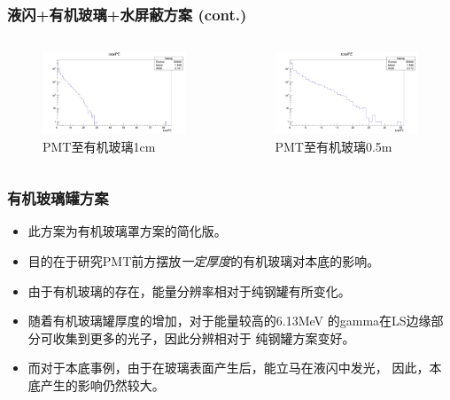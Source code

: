 \begin{frame}
    \frametitle{液闪+有机玻璃+水屏蔽方案 (cont.)}
    \begin{columns}
        \column{6.5cm}
        \begin{figure}
            \includegraphics[width=6.5cm,keepaspectratio]{data/water_1.0m_K40_totalPE.png}
            \caption{PMT至有机玻璃1cm}
        \end{figure}
        \column{6.5cm}
        \begin{figure}
            \includegraphics[width=6.5cm,keepaspectratio]{data/water_1.5m_K40_totalPE.png}
            \caption{PMT至有机玻璃0.5m}
        \end{figure}
    \end{columns}
\end{frame}

\begin{frame}
    \frametitle{有机玻璃罐方案}
    \begin{itemize}
        \item 此方案为有机玻璃罩方案的简化版。
        \item 目的在于研究PMT前方摆放{\em 一定厚度}的有机玻璃对本底的影响。
        \item 由于有机玻璃的存在，能量分辨率相对于纯钢罐有所变化。
        \item 随着有机玻璃罐厚度的增加，对于能量较高的6.13MeV
              的gamma在LS边缘部分可收集到更多的光子，因此分辨相对于
              纯钢罐方案变好。
        \item 而对于本底事例，由于在玻璃表面产生后，能立马在液闪中发光，
              因此，本底产生的影响仍然较大。
    \end{itemize}
\end{frame}

